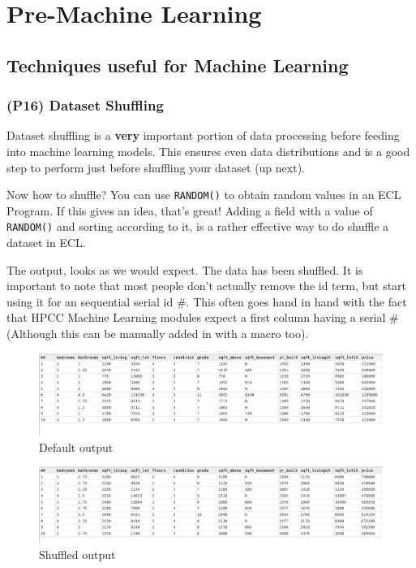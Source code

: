 \documentclass[a4paper,oneside,12pt]{book}
\begin{document}
\chapter{Pre-Machine Learning}
\section{Techniques useful for Machine Learning}
\subsection[Dataset Shuffling]{(P16) Dataset Shuffling}

Dataset shuffling is a \textbf{very} important portion of data processing before feeding into machine learning models. This ensures even data distributions and is a good step to perform just before shuffling your dataset (up next).

Now how to shuffle? You can use \lstinline{RANDOM()} to obtain random values in an ECL Program. If this gives an idea, that's great! Adding a field with a value of \lstinline{RANDOM()} and sorting according to it, is a rather effective way to do shuffle a dataset in ECL.



The output, looks as we would expect. The data has been shuffled. It is important to note that most people don't actually remove the id term, but start using it for an sequential serial id \#. This often goes hand in hand with the fact that HPCC Machine Learning modules expect a first column having a serial \# (Although this can be manually added in with a macro too).

\begin{figure}[h]
    \centering
    \includegraphics[width=\linewidth]{../output/54/default}
    \caption{Default output}
\end{figure}
\begin{figure}[h]
    \centering
    \includegraphics[width=\linewidth]{../output/54/shuffled}
    \caption{Shuffled output}
\end{figure}
\end{document}
